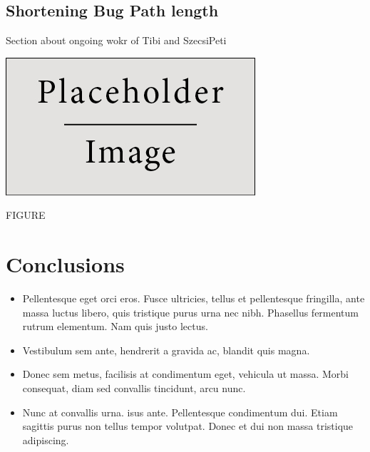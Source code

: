 \documentclass[a0,portrait]{a0poster}
\begin{document}
\begin{multicols}{2}
\subsection*{Shortening Bug Path length}

Section about ongoing wokr of Tibi and SzecsiPeti 

\begin{center}\vspace{1cm}
\includegraphics[width=0.8\linewidth]{placeholder}
\end{center}\vspace{1cm}

FIGURE



\color{SaddleBrown} %

\section*{Conclusions}

\begin{itemize}
\item Pellentesque eget orci eros. Fusce ultricies, tellus et pellentesque fringilla, ante massa luctus libero, quis tristique purus urna nec nibh. Phasellus fermentum rutrum elementum. Nam quis justo lectus.
\item Vestibulum sem ante, hendrerit a gravida ac, blandit quis magna.
\item Donec sem metus, facilisis at condimentum eget, vehicula ut massa. Morbi consequat, diam sed convallis tincidunt, arcu nunc.
\item Nunc at convallis urna. isus ante. Pellentesque condimentum dui. Etiam sagittis purus non tellus tempor volutpat. Donec et dui non massa tristique adipiscing.
\end{itemize}


\end{multicols}
\end{document}
